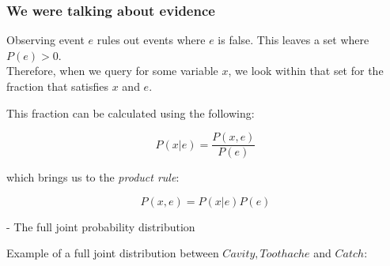 \begin{frame}\frametitle{We were talking about evidence}

Observing event $e$ rules out events where $e$ is false. This leaves a set where $P(e)>0$.\\
Therefore, when we query for some variable $x$,
we look within that set for the fraction that satisfies $x$ and $e$.

This fraction can be calculated using the following:

\begin{equation}
P(x|e) = \frac{P(x,e)}{P(e)}
\end{equation}

which brings us to the \emph{product rule}:

\begin{equation}
P(x,e) = P(x|e) P(e)
\label{eq:productrule}    
\end{equation}

\end{frame}

\begin{frame}


- The full joint probability distribution

Example of a full joint distribution between $\mathit{Cavity},Toothache$ and $\mathit{Catch}$:\\

     \begin{table}[h] 
    \end{table}
	

\end{frame}

